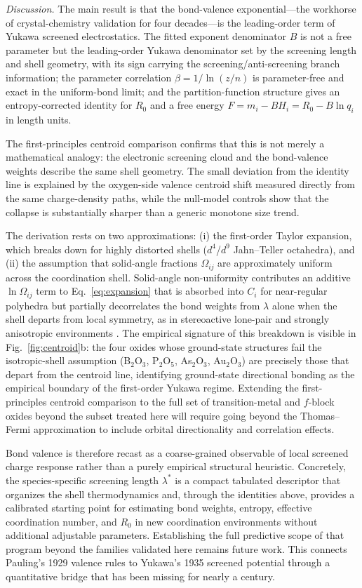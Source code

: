 \documentclass[aps,prl,twocolumn,10pt,superscriptaddress,floatfix]{revtex4-2}
\begin{document}
\emph{Discussion.} The main result is that the bond-valence
exponential---the workhorse of crystal-chemistry validation for four
decades---is the leading-order term of Yukawa screened electrostatics.  The
fitted exponent denominator $B$ is not a free parameter but the
leading-order Yukawa denominator set by the screening length and shell geometry, with its sign carrying the screening/anti-screening branch information; the parameter correlation
$\beta=1/\ln(z/n)$ is parameter-free and exact in the uniform-bond limit;
and the partition-function structure gives an entropy-corrected identity
for $R_0$ and a free energy $F=m_i-BH_i=R_0-B\ln q_i$ in length units.

The first-principles centroid comparison confirms that this is not merely a
mathematical analogy: the electronic screening cloud and the bond-valence
weights describe the same shell geometry.  The small deviation from the
identity line is explained by the oxygen-side valence centroid shift
measured directly from the same charge-density paths, while the null-model
controls show that the collapse is substantially sharper than a generic
monotone size trend.

The derivation rests on two approximations: (i) the first-order Taylor
expansion, which breaks down for highly distorted shells ($d^4$/$d^9$
Jahn--Teller octahedra), and (ii) the assumption that solid-angle
fractions $\Omega_{ij}$ are approximately uniform across the
coordination shell.  Solid-angle non-uniformity contributes an additive
$\ln\Omega_{ij}$ term to Eq.~\eqref{eq:expansion} that is absorbed into
$C_i$ for near-regular polyhedra but partially decorrelates the bond
weights from $\lambda$ alone when the shell departs from local
symmetry, as in stereoactive lone-pair and strongly anisotropic
environments \cite{Bosi2014,Brown2016}.  The empirical signature of
this breakdown is visible in Fig.~\ref{fig:centroid}b: the four
oxides whose ground-state structures fail the isotropic-shell
assumption (B$_2$O$_3$, P$_2$O$_5$, As$_2$O$_3$, Au$_2$O$_3$) are
precisely those that depart from the centroid line, identifying
ground-state directional bonding as the empirical boundary of the
first-order Yukawa regime.  Extending the first-principles centroid comparison to the full set of
transition-metal and $f$-block oxides beyond the subset treated here
will require going beyond the Thomas--Fermi approximation to include
orbital directionality and correlation effects.

Bond valence is therefore recast as a coarse-grained observable of local
screened charge response rather than a purely empirical structural
heuristic.  Concretely, the species-specific screening length
$\lambda^*$ is a compact tabulated descriptor that organizes the shell
thermodynamics and, through the identities above, provides a calibrated
starting point for estimating bond weights, entropy, effective
coordination number, and $R_0$ in new coordination environments without
additional adjustable parameters.  Establishing the full predictive scope of that program
beyond the families validated here remains future work.  This connects
Pauling's 1929 valence rules
\cite{Pauling1929} to Yukawa's 1935 screened potential \cite{Yukawa1935}
through a quantitative bridge that has been missing for nearly a century.
\end{document}

